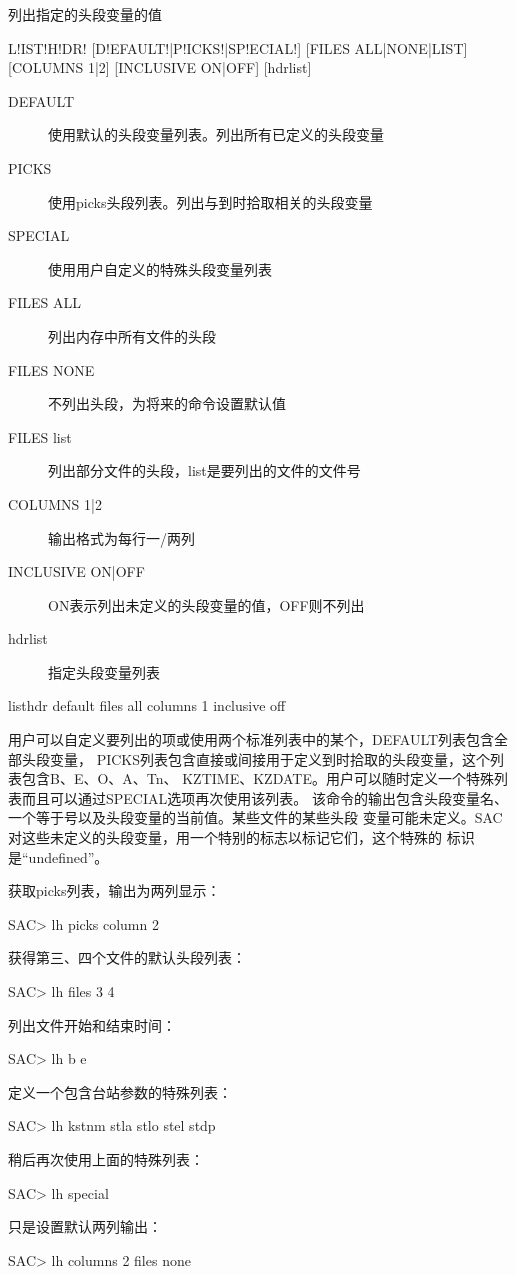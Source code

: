 \label{cmd:listhdr}

列出指定的头段变量的值

\begin{SACSTX}
L!IST!H!DR! [D!EFAULT!|P!ICKS!|SP!ECIAL!] [FILES ALL|NONE|LIST]
    [COLUMNS 1|2] [INCLUSIVE ON|OFF] [hdrlist]
\end{SACSTX}

\begin{description}
\item [DEFAULT] 使用默认的头段变量列表。列出所有已定义的头段变量
\item [PICKS] 使用picks头段列表。列出与到时拾取相关的头段变量
\item [SPECIAL] 使用用户自定义的特殊头段变量列表
\item [FILES ALL] 列出内存中所有文件的头段
\item [FILES NONE] 不列出头段，为将来的命令设置默认值
\item [FILES list] 列出部分文件的头段，list是要列出的文件的文件号
\item [COLUMNS 1|2] 输出格式为每行一/两列
\item [INCLUSIVE ON|OFF] ON表示列出未定义的头段变量的值，OFF则不列出
\item [hdrlist] 指定头段变量列表
\end{description}

\begin{SACDFT}
listhdr default files all columns 1 inclusive off
\end{SACDFT}

用户可以自定义要列出的项或使用两个标准列表中的某个，DEFAULT列表包含全部头段变量，
PICKS列表包含直接或间接用于定义到时拾取的头段变量，这个列表包含B、E、O、A、Tn、
KZTIME、KZDATE。用户可以随时定义一个特殊列表而且可以通过SPECIAL选项再次使用该列表。
该命令的输出包含头段变量名、一个等于号以及头段变量的当前值。某些文件的某些头段
变量可能未定义。SAC对这些未定义的头段变量，用一个特别的标志以标记它们，这个特殊的
标识是``undefined''。

获取picks列表，输出为两列显示：
\begin{SACCode}
SAC> lh picks column 2
\end{SACCode}

获得第三、四个文件的默认头段列表：
\begin{SACCode}
SAC> lh files 3 4
\end{SACCode}

列出文件开始和结束时间：
\begin{SACCode}
SAC> lh b e
\end{SACCode}

定义一个包含台站参数的特殊列表：
\begin{SACCode}
SAC> lh kstnm stla stlo stel stdp
\end{SACCode}

稍后再次使用上面的特殊列表：
\begin{SACCode}
SAC> lh special
\end{SACCode}

只是设置默认两列输出：
\begin{SACCode}
SAC> lh columns 2 files none
\end{SACCode}

